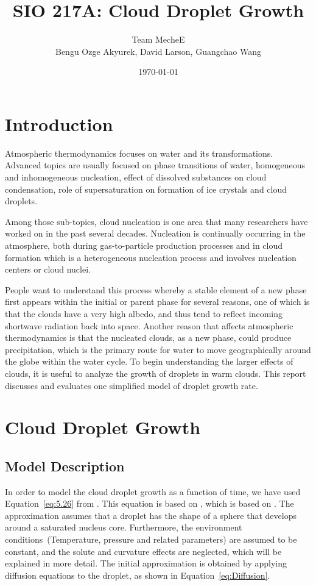 \documentclass[]{article}
\title{SIO 217A: Cloud Droplet Growth}
\author{Team MecheE \\ Bengu Ozge Akyurek, David Larson, Guangchao Wang}
\date{\today}
\begin{document}
\maketitle


\section{Introduction}
Atmospheric thermodynamics focuses on water and its transformations. Advanced
topics are usually focused on phase transitions of water, homogeneous and
inhomogeneous nucleation, effect of dissolved substances on cloud condensation,
role of supersaturation on formation of ice crystals and cloud droplets.

Among those sub-topics, cloud nucleation is one area that
many researchers have worked on in the past several decades. Nucleation is
continually occurring in the atmosphere, both during gas-to-particle production
processes and in cloud formation which is a heterogeneous nucleation process
and involves nucleation centers or cloud nuclei.

People want to understand this process whereby a stable element of a new phase
first appears within the initial or parent phase for several reasons, one of
which is that the clouds have a very high albedo, and thus tend to reflect
incoming shortwave radiation back into space. Another reason that affects
atmospheric thermodynamics is that the nucleated clouds, as a new phase, could
produce precipitation, which is the primary route for water to move
geographically around the globe within the water cycle. To begin understanding
the larger effects of clouds, it is useful to analyze the growth of droplets in
warm clouds. This report discusses and evaluates one simplified model of
droplet growth rate.


\section{Cloud Droplet Growth}

\subsection{Model Description}
In order to model the cloud droplet growth as a function of time, we have used
Equation~\eqref{eq:5.26} from \cite{Curry}. This equation is based on
\cite{Mason}, which is based on \cite{Best}. The approximation assumes that a
droplet has the shape of a sphere that develops around a saturated nucleus core. Furthermore,
the environment conditions~(Temperature, pressure and related parameters) are assumed to be constant, and the solute and
curvature effects are neglected, which will be explained in more detail. The initial approximation is obtained by
applying diffusion equations to the droplet, as shown in
Equation~\eqref{eq:Diffusion}.
\end{document}
